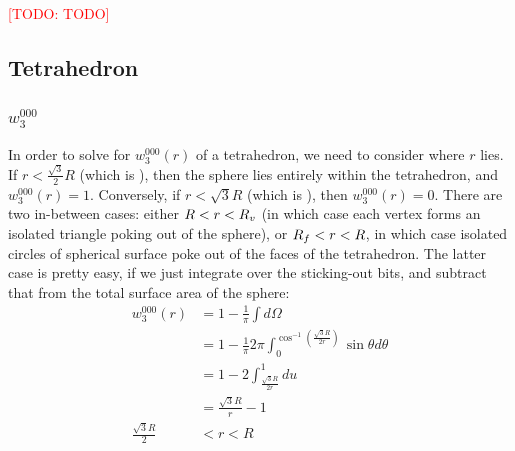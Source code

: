 \documentclass[letterpaper,twocolumn,amsmath,amssymb,pre]{revtex4-1}
\newcommand{\todo}[1]{\textcolor{red}{[TODO: #1]}}
\begin{document}
\todo{TODO}

\subsection{Tetrahedron}

\subsubsection{$w_3^{000}$}

In order to solve for $w_3^{000}(r)$ of a tetrahedron, we need to
consider where $r$ lies.  If $r<\frac{\sqrt{3}}{2}R$ (which is
\Rface), then the sphere lies entirely within the tetrahedron, and
$w_3^{000}(r)=1$.  Conversely, if $r<\sqrt{3}R$ (which is \Rvertex),
then $w_3^{000}(r)=0$.  There are two in-between cases:  either
$R<r<R_v$ (in which case each vertex forms an isolated triangle
poking out of the sphere), or $R_f<r<R$, in which case isolated
circles of spherical surface poke out of the faces of the
tetrahedron.  The latter case is pretty easy, if we just integrate
over the sticking-out bits, and subtract that from the total surface
area of the sphere:
\begin{align}
  w_3^{000}(r) &= 1 - \frac1{\pi}\int d\Omega \\
  &= 1 - \frac1{\pi}2\pi \int_0^{\cos^{-1}\left(\frac{\sqrt{3}R}{2r}\right)} \sin\theta d\theta
  \\
  &= 1 - 2 \int^1_{\frac{\sqrt{3}R}{2r}} du
  \\
  &= \frac{\sqrt{3}R}{r} - 1
  \\
  \frac{\sqrt{3}R}{2}&<r<R
\end{align}
\end{document}
